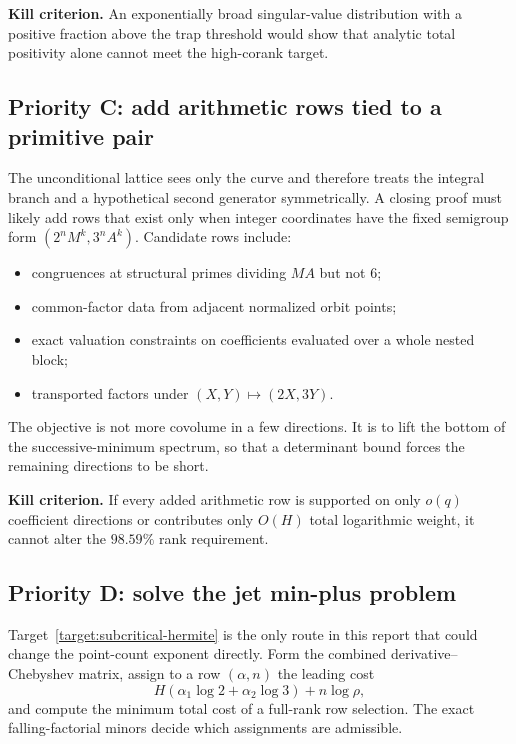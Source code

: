 \documentclass[11pt,oneside]{article}
\theoremstyle{definition}
\theoremstyle{remark}
\begin{document}
\textbf{Kill criterion.}  An exponentially broad singular-value distribution with a positive
fraction above the trap threshold would show that analytic total positivity alone cannot meet
the high-corank target.

\subsection{Priority C: add arithmetic rows tied to a primitive pair}

The unconditional lattice sees only the curve and therefore treats the integral branch and a
hypothetical second generator symmetrically.  A closing proof must likely add rows that exist
only when integer coordinates have the fixed semigroup form
$(2^nM^k,3^nA^k)$.  Candidate rows include:

\begin{itemize}
\item congruences at structural primes dividing $MA$ but not $6$;
\item common-factor data from adjacent normalized orbit points;
\item exact valuation constraints on coefficients evaluated over a whole nested block;
\item transported factors under $(X,Y)\mapsto(2X,3Y)$.
\end{itemize}

The objective is not more covolume in a few directions.  It is to lift the bottom of the
successive-minimum spectrum, so that a determinant bound forces the remaining directions to be
short.

\textbf{Kill criterion.}  If every added arithmetic row is supported on only $o(q)$ coefficient
directions or contributes only $O(H)$ total logarithmic weight, it cannot alter the
$98.59\%$ rank requirement.

\subsection{Priority D: solve the jet min-plus problem}

Target~\ref{target:subcritical-hermite} is the only route in this report that could change the
point-count exponent directly.  Form the combined derivative--Chebyshev matrix, assign to a row
$(\alpha,n)$ the leading cost
\[
 H(\alpha_1\log2+\alpha_2\log3)+n\log\rho,
\]
and compute the minimum total cost of a full-rank row selection.  The exact falling-factorial
minors decide which assignments are admissible.
\end{document}
